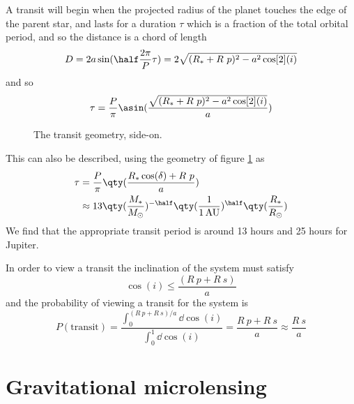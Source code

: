 A transit will begin when the projected radius of the planet touches
the edge of the parent star, and lasts for a duration $\tau$ which is
a fraction of the total orbital period, and so the distance is a chord
of length
\begin{equation}
  \label{eq:22}
  D = 2 a \sin( \half \frac{2 \pi}{P} \tau) = 2 \sqrt{( R_{*} + R~p)^2 - a^2 \cos[2](i)}
\end{equation}
and so
\begin{equation}
  \label{eq:23}
  \tau = \frac{P}{\pi} \asin( \frac{\sqrt{(R_{*}+R~p)^2 - a^2 \cos[2](i)}}{a} )
\end{equation}
\begin{figure}[b]
  \centering
  \caption{The transit geometry, side-on.}
  \label{fig:transit-geometry-2}
\end{figure}
This can also be described, using the geometry of figure
\ref{fig:transit-geometry-2} as
\begin{align*}
  \label{eq:24}
  \tau &= \frac{P}{\pi} \qty( \frac{R_{*} \cos(\delta) + R~p}{a} ) \\ &\approx 13 \qty( \frac{M_{*}}{M_{\odot}})^{-\half} \qty( \frac{1}{1\,\text{AU}} )^{\half} \qty( \frac{R_{*}}{R_{\odot}} )
\end{align*}
We find that the appropriate transit period is around 13 hours and 25
hours for Jupiter.

In order to view a transit the inclination of the system must
satisfy \[ \cos(i) \le \frac{(R~p + R~s)}{a} \] and the probability of
viewing a transit for the system is
\begin{equation}
  \label{eq:25}
  P(\text{transit}) = \frac{\int_0^{(R~p+R~s)/a} \dd{\cos(i)}}{\int_0^1 \dd{\cos(i)}} = \frac{R~p + R~s}{a} \approx \frac{R~s}{a}
\end{equation}

\section{Gravitational microlensing}
\label{sec:grav-micr}

